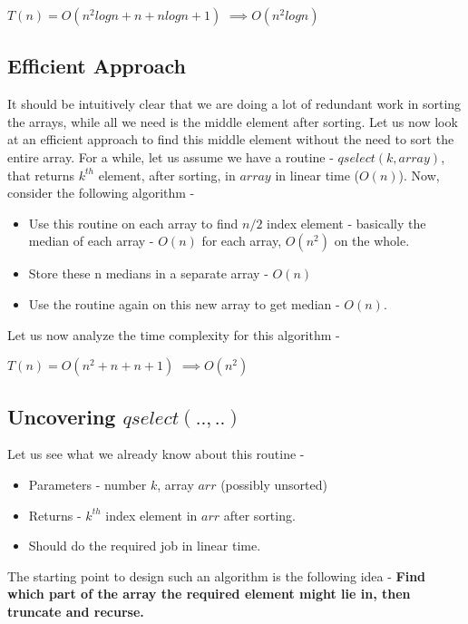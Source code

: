 \documentclass[journal,12pt,twocolumn]{IEEEtran}
\begin{document}
    $T(n) = O(n^{2}logn + n + nlogn + 1)$ 
    $\implies O(n^{2}logn)$


\subsection{Efficient Approach}
It should be intuitively clear that we are doing a lot of redundant work in sorting the arrays, while all we need is the middle element after sorting. Let us now look at an efficient approach to find this middle element without the need to sort the entire array. For a while, let us assume we have a routine - $qselect(k, array)$, that returns $k^{th}$ element, after sorting, in $array$ in linear time ($O(n)$).
Now, consider the following algorithm - 
    \begin{itemize}
        \item Use this routine on each array to find $n/2$ index element - basically the median of each array - $O(n)$ for each array, $O(n^{2})$ on the whole.
        \item Store these n medians in a separate array - $O(n)$
        \item Use the routine again on this new array to get median -  $O(n)$.
    \end{itemize} 


Let us now analyze the time complexity for this algorithm - 
\newline

    $T(n)  = O(n^{2} + n + n + 1)$
    $\implies O(n^{2})$

\subsection{Uncovering $qselect(.. , ..)$}

Let us see what we already know about this routine - 
    \begin{itemize}
        \item Parameters - number $k$, array $arr$ (possibly unsorted)
        \item Returns - $k^{th}$ index element in $arr$ after sorting.
        \item Should do the required job in linear time.
    \end{itemize}
    
The starting point to design such an algorithm is the following idea  - 
\newline
\textbf{Find which part of the array the required element might lie in, then truncate and recurse.
}
\end{document}
